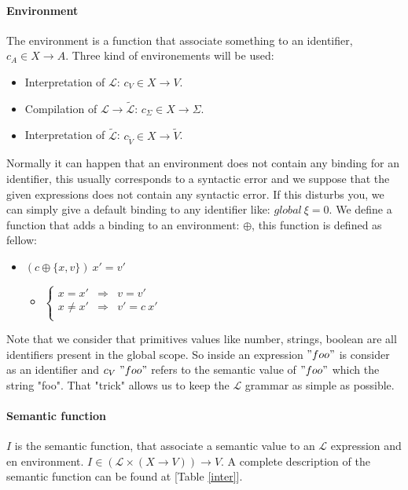\documentclass[a4paper]{report}
\newcommand{\lang}[0]{\mathcal{L}}
\newcommand{\locus}[1]{\widetilde{#1}}
\newcommand{\reftab}[1]{[Table \ref{#1}]}
\begin{document}
\paragraph{Environment} The environment is a function that associate something to an identifier, $c_A\in X\to A$. Three kind of environements will be used:
\begin{itemize}
\item Interpretation of $\lang$: $c_V\in X \to V$.
\item Compilation of $\lang\to\locus{\lang}$: $c_\Sigma\in X\to\Sigma$.
\item Interpretation of $\locus{\lang}$: $c_{\locus V}\in X\to\locus V$.
\end{itemize}
Normally it can happen that an environment does not contain any binding for an identifier, this usually corresponds to a syntactic error and we suppose that the given expressions does not contain any syntactic error. If this disturbs you, we can simply give a default binding to any identifier like: $global\ \xi=0$. We define a function that adds a binding to an environment: $\oplus$, this function is defined as fellow:
\begin{itemize}
\item $(c\oplus\{x,v\})\ x'=v'$
	\begin{itemize}
	\item $\left\{\begin{array}{ccl}
		x=x'&\Rightarrow&v = v'\\
		x\neq x'&\Rightarrow&v' = c\ x'\\
		\end{array}\right.$
	\end{itemize}
\end{itemize}
Note that we consider that primitives values like number, strings, boolean are all identifiers present in the global scope. So inside an expression $"foo"$ is consider as an identifier and $c_V\ "foo"$ refers to the semantic value of $"foo"$ which the string "foo". That "trick" allows us to keep the $\lang$ grammar as simple as possible.

\paragraph{Semantic function} $I$ is the semantic function, that associate a semantic value to an $\lang$ expression and en environment. $I \in (\lang\times (X \to V)) \to V$. A complete description of the semantic function can be found at \reftab{inter}.
\end{document}
